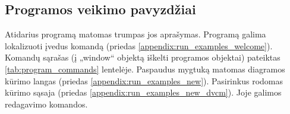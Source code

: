 \subsection{Programos veikimo pavyzdžiai}


Atidarius programą matomas trumpas jos aprašymas. Programą galima lokalizuoti įvedus komandą  (priedas \ref{appendix:run_examples_welcome}). Komandų sąrašas (į „window“ objektą iškelti programos objektai) pateiktas \ref{tab:program_commands} lentelėje. Paspaudus mygtuką  matomas diagramos kūrimo langas (priedas \ref{appendix:run_examples_new}). Pasirinkus \uiWord{\DVCM{}} rodomas \DVCM{} kūrimo sąsaja (priedas \ref{appendix:run_examples_new_dvcm}). Joje galimos \DVCM{} redagavimo komandos.


